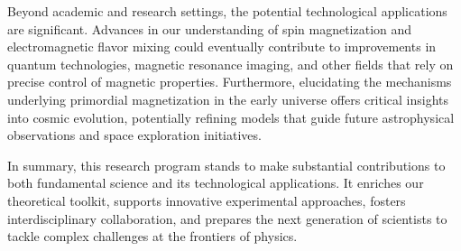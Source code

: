 \documentclass[11pt]{article}
\begin{document}
Beyond academic and research settings, the potential technological applications are significant. Advances in our understanding of spin magnetization and electromagnetic flavor mixing could eventually contribute to improvements in quantum technologies, magnetic resonance imaging, and other fields that rely on precise control of magnetic properties. Furthermore, elucidating the mechanisms underlying primordial magnetization in the early universe offers critical insights into cosmic evolution, potentially refining models that guide future astrophysical observations and space exploration initiatives.

In summary, this research program stands to make substantial contributions to both fundamental science and its technological applications. It enriches our theoretical toolkit, supports innovative experimental approaches, fosters interdisciplinary collaboration, and prepares the next generation of scientists to tackle complex challenges at the frontiers of physics.

\newpage
\end{document}
